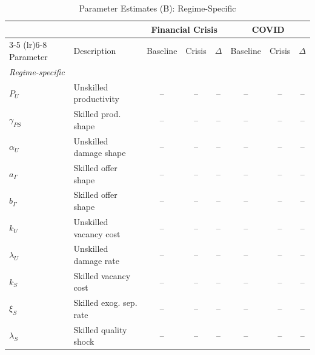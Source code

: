 \begin{table}[htbp]
  \centering
  \caption{Parameter Estimates (B): Regime-Specific}
  \label{tab:param_estimates_b}
  \small
  \begin{tabular}{llcccccc}
    \toprule
    & & \multicolumn{3}{c}{Financial Crisis} & \multicolumn{3}{c}{COVID} \\
    \cmidrule(lr){3-5} \cmidrule(lr){6-8}
    Parameter & Description & Baseline & Crisis & $\Delta$ & Baseline & Crisis & $\Delta$ \\
    \midrule
    \multicolumn{8}{l}{\textit{Regime-specific}} \\[2pt]
    \quad $P_U$ & Unskilled productivity & -- & -- & -- & -- & -- & -- \\
    \quad $\gamma_{PS}$ & Skilled prod. shape & -- & -- & -- & -- & -- & -- \\
    \quad $\alpha_U$ & Unskilled damage shape & -- & -- & -- & -- & -- & -- \\
    \quad $a_\Gamma$ & Skilled offer shape & -- & -- & -- & -- & -- & -- \\
    \quad $b_\Gamma$ & Skilled offer shape & -- & -- & -- & -- & -- & -- \\
    \quad $k_U$ & Unskilled vacancy cost & -- & -- & -- & -- & -- & -- \\
    \quad $\lambda_U$ & Unskilled damage rate & -- & -- & -- & -- & -- & -- \\
    \quad $k_S$ & Skilled vacancy cost & -- & -- & -- & -- & -- & -- \\
    \quad $\xi_S$ & Skilled exog. sep. rate & -- & -- & -- & -- & -- & -- \\
    \quad $\lambda_S$ & Skilled quality shock & -- & -- & -- & -- & -- & -- \\
    [4pt]
    \bottomrule
  \end{tabular}
\end{table}